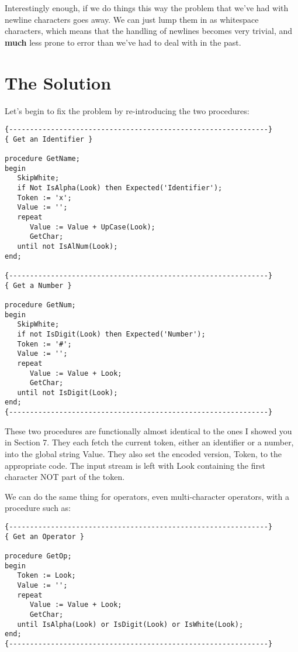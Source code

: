 Interestingly enough, if we do things this way  the  problem that we've had with newline characters goes away. We  can  just  lump them in as  whitespace  characters, which means that the handling of  newlines  becomes  very trivial, and {\bfseries much} less prone to error than we've had to deal with in the past.

\section{The Solution}

Let's  begin  to  fix  the  problem  by  re-introducing  the  two procedures:

\begin{verbatim}
{--------------------------------------------------------------}
{ Get an Identifier }

procedure GetName;
begin
   SkipWhite;
   if Not IsAlpha(Look) then Expected('Identifier');
   Token := 'x';
   Value := '';
   repeat
      Value := Value + UpCase(Look);
      GetChar;
   until not IsAlNum(Look);
end;

{--------------------------------------------------------------}
{ Get a Number }

procedure GetNum;
begin
   SkipWhite;
   if not IsDigit(Look) then Expected('Number');
   Token := '#';
   Value := '';
   repeat
      Value := Value + Look;
      GetChar;
   until not IsDigit(Look);
end;
{--------------------------------------------------------------}
\end{verbatim}


These two procedures are  functionally  almost  identical  to the ones  I  showed  you in Section 7. They each  fetch  the  current token, either an identifier or a number, into  the  global string Value. They  also  set  the  encoded  version, Token, to  the appropriate code. The input  stream is left with Look containing the first character NOT part of the token.

We  can do the same thing  for  operators, even  multi-character operators, with a procedure such as:

\begin{verbatim}
{--------------------------------------------------------------}
{ Get an Operator }

procedure GetOp;
begin
   Token := Look;
   Value := '';
   repeat
      Value := Value + Look;
      GetChar;
   until IsAlpha(Look) or IsDigit(Look) or IsWhite(Look);
end;
{--------------------------------------------------------------}
\end{verbatim}

